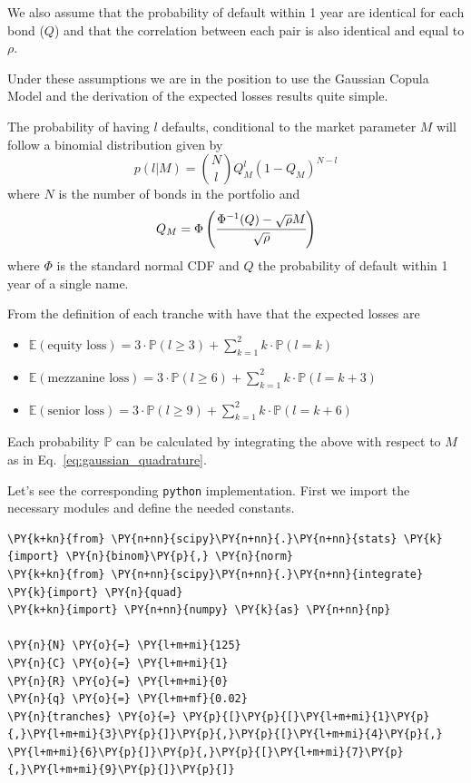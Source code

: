 We also assume that the probability of default within 1 year are identical for each bond ($Q$) and that the correlation between each pair is also identical and equal to $\rho$.

Under these assumptions we are in the position to use the Gaussian Copula Model and the derivation of the expected losses results quite simple.

The probability of having $l$ defaults, conditional to the market parameter $M$ will follow a binomial distribution given by
\begin{equation}
p(l|M) = \binom{N}{l}Q_M^l (1-Q_M)^{N-l}
\label{eq:def_prob_ex_cdo_1}
\end{equation}
where $N$ is the number of bonds in the portfolio and 
\[
Q_M = \Phi\left(\cfrac{\Phi^{-1}(Q)-\sqrt{\rho}M}{\sqrt{\-\rho}}\right)
\]
where $\Phi$ is the standard normal CDF and $Q$ the probability of default within 1 year of a single name.

From the definition of each tranche with have that the expected losses are
\begin{itemize}
	\item $\mathbb{E}(\textrm{equity loss})=3\cdot\mathbb{P}(l\ge 3) + \sum_{k=1}^{2}{k\cdot\mathbb{P}(l=k)}$
	\item $\mathbb{E}(\textrm{mezzanine loss})=3\cdot\mathbb{P}(l\ge 6) + \sum_{k=1}^{2}{k\cdot\mathbb{P}(l=k+3)}$
	\item $\mathbb{E}(\textrm{senior loss})=3\cdot\mathbb{P}(l\ge 9) + \sum_{k=1}^{2}{k\cdot\mathbb{P}(l=k+6)}$
\end{itemize}

Each probability $\mathbb{P}$ can be calculated by integrating the above with respect to $M$ as in Eq.~\ref{eq:gaussian_quadrature}.

Let's see the corresponding \texttt{python} implementation.
First we import the necessary modules and define the needed constants.

\begin{tcolorbox}[breakable, size=fbox, boxrule=1pt, pad at break*=1mm,colback=cellbackground, colframe=cellborder]
\begin{Verbatim}[commandchars=\\\{\}]
\PY{k+kn}{from} \PY{n+nn}{scipy}\PY{n+nn}{.}\PY{n+nn}{stats} \PY{k}{import} \PY{n}{binom}\PY{p}{,} \PY{n}{norm}
\PY{k+kn}{from} \PY{n+nn}{scipy}\PY{n+nn}{.}\PY{n+nn}{integrate} \PY{k}{import} \PY{n}{quad}
\PY{k+kn}{import} \PY{n+nn}{numpy} \PY{k}{as} \PY{n+nn}{np}
	
\PY{n}{N} \PY{o}{=} \PY{l+m+mi}{125}
\PY{n}{C} \PY{o}{=} \PY{l+m+mi}{1}
\PY{n}{R} \PY{o}{=} \PY{l+m+mi}{0}
\PY{n}{q} \PY{o}{=} \PY{l+m+mf}{0.02}
\PY{n}{tranches} \PY{o}{=} \PY{p}{[}\PY{p}{[}\PY{l+m+mi}{1}\PY{p}{,}\PY{l+m+mi}{3}\PY{p}{]}\PY{p}{,}\PY{p}{[}\PY{l+m+mi}{4}\PY{p}{,} \PY{l+m+mi}{6}\PY{p}{]}\PY{p}{,}\PY{p}{[}\PY{l+m+mi}{7}\PY{p}{,}\PY{l+m+mi}{9}\PY{p}{]}\PY{p}{]}
\end{Verbatim}
\end{tcolorbox}

